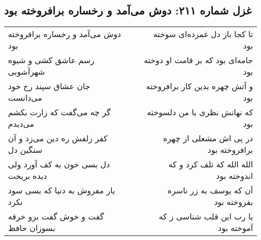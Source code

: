 \begin{center}
\section*{غزل شماره ۲۱۱: دوش می‌آمد و رخساره برافروخته بود}
\label{sec:sh211}
\begin{longtable}{l p{0.5cm} r}
دوش می‌آمد و رخساره برافروخته بود
&&
تا کجا باز دل غمزده‌ای سوخته بود
\\
رسم عاشق کشی و شیوه شهرآشوبی
&&
جامه‌ای بود که بر قامت او دوخته بود
\\
جان عشاق سپند رخ خود می‌دانست
&&
و آتش چهره بدین کار برافروخته بود
\\
گر چه می‌گفت که زارت بکشم می‌دیدم
&&
که نهانش نظری با من دلسوخته بود
\\
کفر زلفش ره دین می‌زد و آن سنگین دل
&&
در پی اش مشعلی از چهره برافروخته بود
\\
دل بسی خون به کف آورد ولی دیده بریخت
&&
الله الله که تلف کرد و که اندوخته بود
\\
یار مفروش به دنیا که بسی سود نکرد
&&
آن که یوسف به زر ناسره بفروخته بود
\\
گفت و خوش گفت برو خرقه بسوزان حافظ
&&
یا رب این قلب شناسی ز که آموخته بود
\\
\end{longtable}
\end{center}
